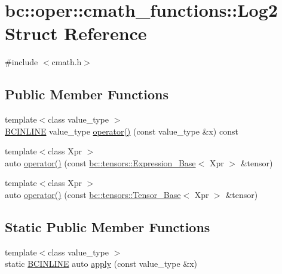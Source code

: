 \hypertarget{structbc_1_1oper_1_1cmath__functions_1_1Log2}{}\section{bc\+:\+:oper\+:\+:cmath\+\_\+functions\+:\+:Log2 Struct Reference}
\label{structbc_1_1oper_1_1cmath__functions_1_1Log2}


{\ttfamily \#include $<$cmath.\+h$>$}

\subsection*{Public Member Functions}
\begin{DoxyCompactItemize}
\item 
{\footnotesize template$<$class value\+\_\+type $>$ }\\\hyperlink{common_8h_a6699e8b0449da5c0fafb878e59c1d4b1}{B\+C\+I\+N\+L\+I\+NE} value\+\_\+type \hyperlink{structbc_1_1oper_1_1cmath__functions_1_1Log2_a12965107880bfa752dfe41e57f7e29c4}{operator()} (const value\+\_\+type \&x) const
\item 
{\footnotesize template$<$class Xpr $>$ }\\auto \hyperlink{structbc_1_1oper_1_1cmath__functions_1_1Log2_a57496f3baae3c207ec16b69391822119}{operator()} (const \hyperlink{classbc_1_1tensors_1_1Expression__Base}{bc\+::tensors\+::\+Expression\+\_\+\+Base}$<$ Xpr $>$ \&tensor)
\item 
{\footnotesize template$<$class Xpr $>$ }\\auto \hyperlink{structbc_1_1oper_1_1cmath__functions_1_1Log2_a8ef24238234bef42522aa9522346c2b9}{operator()} (const \hyperlink{classbc_1_1tensors_1_1Tensor__Base}{bc\+::tensors\+::\+Tensor\+\_\+\+Base}$<$ Xpr $>$ \&tensor)
\end{DoxyCompactItemize}
\subsection*{Static Public Member Functions}
\begin{DoxyCompactItemize}
\item 
{\footnotesize template$<$class value\+\_\+type $>$ }\\static \hyperlink{common_8h_a6699e8b0449da5c0fafb878e59c1d4b1}{B\+C\+I\+N\+L\+I\+NE} auto \hyperlink{structbc_1_1oper_1_1cmath__functions_1_1Log2_a4bbe653b401add993394e3cb60c9de58}{apply} (const value\+\_\+type \&x)
\end{DoxyCompactItemize}


